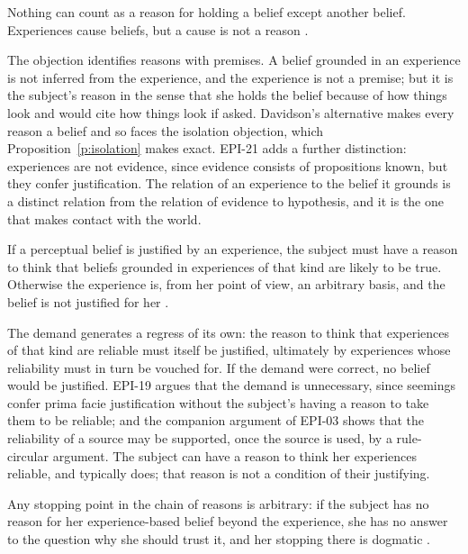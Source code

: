 \documentclass{situationist-preprint}
\begin{document}
\begin{objection}
Nothing can count as a reason for holding a belief except another belief. Experiences cause beliefs, but a cause is not a reason \citep{Davidson1986}.
\end{objection}

\begin{reply}
The objection identifies reasons with premises. A belief grounded in an experience is not inferred from the experience, and the experience is not a premise; but it is the subject's reason in the sense that she holds the belief because of how things look and would cite how things look if asked. Davidson's alternative makes every reason a belief and so faces the isolation objection, which Proposition~\ref{p:isolation} makes exact. EPI-21 adds a further distinction: experiences are not evidence, since evidence consists of propositions known, but they confer justification. The relation of an experience to the belief it grounds is a distinct relation from the relation of evidence to hypothesis, and it is the one that makes contact with the world.
\end{reply}

\begin{objection}
If a perceptual belief is justified by an experience, the subject must have a reason to think that beliefs grounded in experiences of that kind are likely to be true. Otherwise the experience is, from her point of view, an arbitrary basis, and the belief is not justified for her \citep{BonJour1978}.
\end{objection}

\begin{reply}
The demand generates a regress of its own: the reason to think that experiences of that kind are reliable must itself be justified, ultimately by experiences whose reliability must in turn be vouched for. If the demand were correct, no belief would be justified. EPI-19 argues that the demand is unnecessary, since seemings confer prima facie justification without the subject's having a reason to take them to be reliable; and the companion argument of EPI-03 shows that the reliability of a source may be supported, once the source is used, by a rule-circular argument. The subject can have a reason to think her experiences reliable, and typically does; that reason is not a condition of their justifying.
\end{reply}

\begin{objection}[Arbitrariness]
Any stopping point in the chain of reasons is arbitrary: if the subject has no reason for her experience-based belief beyond the experience, she has no answer to the question why she should trust it, and her stopping there is dogmatic \citep{Klein1999}.
\end{objection}
\end{document}
